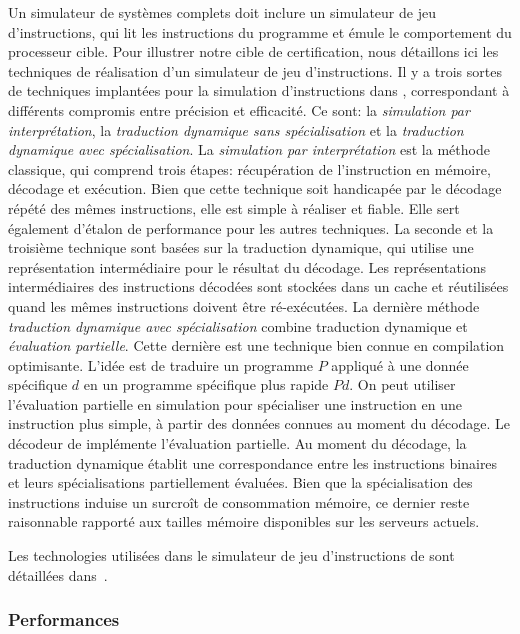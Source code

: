 Un simulateur de systèmes complets doit inclure
un simulateur de jeu d'instructions, 
qui lit les instructions du programme et émule le comportement
du processeur cible.
Pour illustrer notre cible de certification,
nous détaillons ici les techniques de réalisation 
d'un simulateur de jeu d'instructions.
Il y a trois sortes de techniques implantées pour la simulation d'instructions
dans \simsoc,
correspondant à différents compromis entre précision et efficacité.
Ce sont:
la \emph{simulation par interprétation},
la \emph{traduction dynamique sans spécialisation}
et la \emph{traduction dynamique avec spécialisation}.
%
La \emph{simulation par interprétation} est la méthode classique,
qui comprend trois étapes:
récupération de l'instruction en mémoire, décodage et exécution.
Bien que cette technique soit handicapée par
le décodage répété des mêmes instructions,
elle est simple à réaliser et fiable.
Elle sert également d'étalon de performance pour les autres techniques.
%
La seconde et la troisième technique sont basées sur la traduction dynamique,
qui utilise une représentation intermédiaire pour le résultat du décodage.
Les représentations intermédiaires des instructions décodées sont
stockées dans un cache et réutilisées quand les mêmes instructions
doivent être ré-exécutées.
%
La dernière méthode \emph{traduction dynamique avec spécialisation}
combine traduction dynamique et \emph{évaluation partielle}.
Cette dernière est une technique bien connue en compilation optimisante.
L'idée est de traduire un programme $P$ appliqué à une donnée spécifique $d$
en un programme spécifique plus rapide $Pd$.
On peut utiliser l'évaluation partielle en simulation pour spécialiser 
une instruction en une instruction plus simple,
à partir des données connues au moment du décodage.
Le décodeur de \simsoc implémente l'évaluation partielle.
Au moment du décodage, la traduction dynamique établit une correspondance
entre les instructions binaires et leurs spécialisations partiellement évaluées.
Bien que la spécialisation des instructions induise un surcroît
de consommation mémoire, ce dernier reste raisonnable rapporté
aux tailles mémoire disponibles sur les serveurs actuels.

Les technologies utilisées dans le simulateur de jeu d'instructions 
de \simsoc sont détaillées dans~\cite{ossc09}.



\subsubsection*{Performances}

